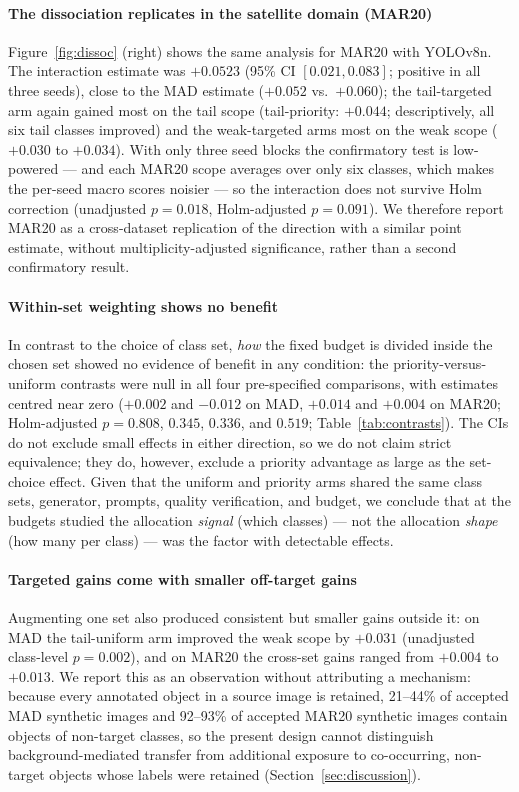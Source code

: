 \documentclass[preprint,12pt,authoryear]{elsarticle}
\begin{document}
\paragraph{The dissociation replicates in the satellite domain (MAR20)}
Figure~\ref{fig:dissoc} (right) shows the same analysis for MAR20 with
YOLOv8n. The interaction estimate was $+0.0523$ (95\% CI
$[0.021, 0.083]$; positive in all three seeds), close to the MAD
estimate ($+0.052$ vs.\ $+0.060$); the tail-targeted arm again gained
most on the tail scope (tail-priority: $+0.044$; descriptively, all six
tail classes improved) and the weak-targeted arms most on the weak
scope ($+0.030$ to $+0.034$). With only three seed blocks the
confirmatory test is low-powered --- and each MAR20 scope averages over
only six classes, which makes the per-seed macro scores noisier --- so
the interaction does not survive Holm correction (unadjusted
$p = 0.018$, Holm-adjusted $p = 0.091$). We therefore report MAR20 as a
cross-dataset replication of the direction with a similar point
estimate, without multiplicity-adjusted significance, rather than a
second confirmatory result.

\paragraph{Within-set weighting shows no benefit}
In contrast to the choice of class set, \emph{how} the fixed budget is
divided inside the chosen set showed no evidence of benefit in any
condition: the priority-versus-uniform contrasts were null in all four
pre-specified comparisons, with estimates centred near zero ($+0.002$
and $-0.012$ on MAD, $+0.014$ and $+0.004$ on MAR20; Holm-adjusted
$p = 0.808$, $0.345$, $0.336$, and $0.519$;
Table~\ref{tab:contrasts}). The CIs do
not exclude small effects in either direction, so we do not claim
strict equivalence; they do, however, exclude a priority advantage as
large as the set-choice effect. Given that the uniform and priority
arms shared the same class sets, generator, prompts, quality
verification, and budget, we conclude that at the budgets studied the
allocation \emph{signal} (which classes) --- not the allocation
\emph{shape} (how many per class) --- was the factor with detectable
effects.

\paragraph{Targeted gains come with smaller off-target gains}
Augmenting one set also produced consistent but smaller gains outside
it: on MAD the tail-uniform arm improved the weak scope by $+0.031$
(unadjusted class-level $p = 0.002$), and on MAR20 the cross-set gains
ranged from $+0.004$ to $+0.013$. We report this as an observation
without attributing a mechanism: because every annotated object in a
source image is retained, 21--44\% of accepted MAD synthetic images and
92--93\% of accepted MAR20 synthetic images contain objects of
non-target classes, so the present design cannot distinguish
background-mediated transfer from additional exposure to co-occurring,
non-target objects whose labels were retained
(Section~\ref{sec:discussion}).
\end{document}
